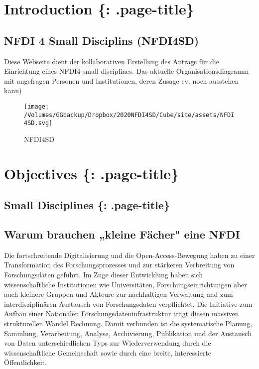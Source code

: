 \hypertarget{introduction-.page-title}{%
\section{Introduction \{:
.page-title\}}\label{introduction-.page-title}}

\hypertarget{nfdi-4-small-disciplins-nfdi4sd}{%
\subsection{\texorpdfstring{\textbf{NFDI 4 Small Disciplins
(NFDI4SD)}}{NFDI 4 Small Disciplins (NFDI4SD)}}\label{nfdi-4-small-disciplins-nfdi4sd}}

Diese Webseite dient der kollaborativen Erstellung des Antrags für die
Einrichtung eines NFDI4 small disciplines. Das aktuelle
Organisationsdiagramm mit angefragen Personen und Institutionen, deren
Zusage ev. noch ausstehen kann)

\begin{figure}
\centering
\texttt{[image: /Volumes/GGbackup/Dropbox/2020NFDI4SD/Cube/site/assets/NFDI4SD.svg]}
\caption{NFDI4SD}
\end{figure}

\hypertarget{objectives-.page-title}{%
\section{Objectives \{: .page-title\}}\label{objectives-.page-title}}

\hypertarget{small-disciplines-.page-title}{%
\subsection{Small Disciplines \{:
.page-title\}}\label{small-disciplines-.page-title}}

\hypertarget{warum-brauchen-kleine-fuxe4cher-eine-nfdi}{%
\subsection{Warum brauchen „kleine Fächer" eine
NFDI}\label{warum-brauchen-kleine-fuxe4cher-eine-nfdi}}

Die fortschreitende Digitalisierung und die Open-Access-Bewegung haben
zu einer Transformation des Forschungsprozesses und zur stärkeren
Verbreitung von Forschungsdaten geführt. Im Zuge dieser Entwicklung
haben sich wissenschaftliche Institutionen wie Universitäten,
Forschungseinrichtungen aber auch kleinere Gruppen und Akteure zur
nachhaltigen Verwaltung und zum interdisziplinären Austausch von
Forschungsdaten verpflichtet. Die Initiative zum Aufbau einer Nationalen
Forschungsdateninfrastruktur trägt diesen massiven strukturellen Wandel
Rechnung. Damit verbunden ist die systematische Planung, Sammlung,
Verarbeitung, Analyse, Archivierung, Publikation und der Austausch von
Daten unterschiedlichen Typs zur Wiederverwendung durch die
wissenschaftliche Gemeinschaft sowie durch eine breite, interessierte
Öffentlichkeit.

